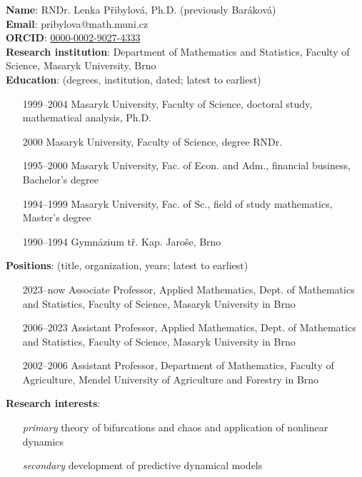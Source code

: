 \documentclass[a4paper,11pt]{scrartcl}
\begin{document}
\textbf{Name}: RNDr. Lenka Přibylová, Ph.D. (previously Baráková) \\
\textbf{Email}: pribylova@math.muni.cz \\
\textbf{ORCID}: \href{https://orcid.org/0000-0002-9027-4333}{0000-0002-9027-4333}\\
\textbf{Research institution}: Department of Mathematics and Statistics, Faculty of Science, Masaryk University, Brno \\
\textbf{Education}: (degrees, institution, dated; latest to earliest)
\begin{enumerate}[leftmargin=2.5cm]
    \item[1999--2004] Masaryk University, Faculty of Science, doctoral study, mathematical analysis, Ph.D.
    \item[2000] Masaryk University, Faculty of Science, degree RNDr.
    \item[1995--2000] Masaryk University, Fac. of Econ. and Adm., financial business, Bachelor's degree
    \item[1994--1999] Masaryk University, Fac. of Sc., field of study mathematics, Master's degree
    \item[1990--1994] Gymnázium tř. Kap. Jaroše, Brno
\end{enumerate}
\textbf{Positions}: (title, organization, years; latest to earliest)
\begin{enumerate}[leftmargin=2.5cm]
    \item[2023--now] Associate Professor, Applied Mathematics, Dept. of Mathematics and Statistics, Faculty of Science, Masaryk University in Brno
    \item[2006--2023] Assistant Professor, Applied Mathematics, Dept. of Mathematics and Statistics, Faculty of Science, Masaryk University in Brno
    \item[2002--2006] Assistant Professor, Department of Mathematics, Faculty of Agriculture, Mendel University of Agriculture and Forestry in Brno
\end{enumerate}
\textbf{Research interests}: 
\begin{enumerate}[leftmargin=2.5cm]
    \item[\textit{primary}] theory of bifurcations and chaos and application of nonlinear dynamics 
    \item[\textit{secondary}] development of predictive dynamical models
\end{enumerate}
\end{document}
